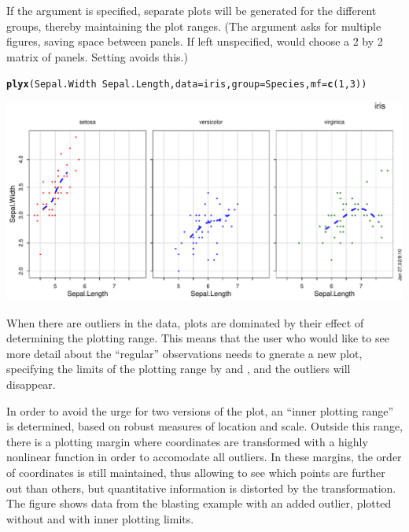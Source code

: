 \documentclass[11pt]{article}\usepackage[]{graphicx}\usepackage[]{color}
\makeatletter
\def\maxwidth{ %
  \ifdim\Gin@nat@width>\linewidth
    \linewidth
  \else
    \Gin@nat@width
  \fi
}
\newcommand{\hlnum}[1]{\textcolor[rgb]{0.686,0.059,0.569}{#1}}%
\newcommand{\hlopt}[1]{\textcolor[rgb]{0,0,0}{#1}}%
\newcommand{\hlstd}[1]{\textcolor[rgb]{0.345,0.345,0.345}{#1}}%
\newcommand{\hlkwc}[1]{\textcolor[rgb]{0.333,0.667,0.333}{#1}}%
\newcommand{\hlkwd}[1]{\textcolor[rgb]{0.737,0.353,0.396}{\textbf{#1}}}%
\newenvironment{kframe}{%
 \def\at@end@of@kframe{}%
 \ifinner\ifhmode%
  \def\at@end@of@kframe{\end{minipage}}%
  \begin{minipage}{\columnwidth}%
 \fi\fi%
 \def\FrameCommand##1{\hskip\@totalleftmargin \hskip-\fboxsep
 \colorbox{shadecolor}{##1}\hskip-\fboxsep
     \hskip-\linewidth \hskip-\@totalleftmargin \hskip\columnwidth}%
 \MakeFramed {\advance\hsize-\width
   \@totalleftmargin\z@ \linewidth\hsize
   \@setminipage}}%
 {\par\unskip\endMakeFramed%
 \at@end@of@kframe}
\newenvironment{knitrout}{}{} %
\makeatother
\begin{document}
If the argument  is specified, separate plots will be generated
for the different groups, thereby maintaining the plot ranges.
(The argument  asks for multiple figures, saving space between panels. 
If left unspecified,
 would choose a 2 by 2 matrix of panels. 
Setting  avoids this.)

\begin{knitrout}
\color{fgcolor}\begin{kframe}
\begin{alltt}
\hlkwd{plyx}\hlstd{(Sepal.Width}\hlopt{~}\hlstd{Sepal.Length,} \hlkwc{data}\hlstd{=iris,} \hlkwc{group}\hlstd{=Species,} \hlkwc{mf}\hlstd{=}\hlkwd{c}\hlstd{(}\hlnum{1}\hlstd{,}\hlnum{3}\hlstd{))}
\end{alltt}
\end{kframe}
\includegraphics[width=\maxwidth]{figure/plyx_group-1} 

\end{knitrout}

When there are outliers in the data, plots are dominated by their effect of
determining the plotting range. This means that the user who would like to
see more detail about the ``regular'' observations needs to gnerate a new
plot, specifying the limits of the plotting range by  and ,
and the outliers will disappear.

In order to avoid the urge for two versions of the plot, an ``inner
plotting range'' is determined, based on robust measures of 
location and scale. Outside this range, there is a plotting margin where
coordinates are transformed with a highly nonlinear function in order to
accomodate all outliers. 
In these margins, the order of coordinates is still maintained, thus
allowing to see which points are further out than others, but quantitative
information is distorted by the transformation.
The figure shows data from the blasting example with an added outlier,
plotted without and with inner plotting limits.
\end{document}

